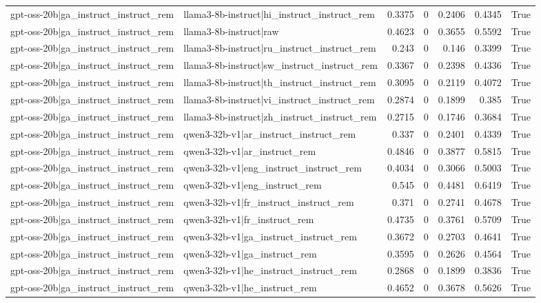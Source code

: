 \begin{table}
\begin{tabular}{l l r r r r l}
gpt-oss-20b|ga_instruct_instruct_rem & llama3-8b-instruct|hi_instruct_instruct_rem & 0.3375 & 0 & 0.2406 & 0.4345 & True \\
gpt-oss-20b|ga_instruct_instruct_rem & llama3-8b-instruct|raw & 0.4623 & 0 & 0.3655 & 0.5592 & True \\
gpt-oss-20b|ga_instruct_instruct_rem & llama3-8b-instruct|ru_instruct_instruct_rem & 0.243 & 0 & 0.146 & 0.3399 & True \\
gpt-oss-20b|ga_instruct_instruct_rem & llama3-8b-instruct|sw_instruct_instruct_rem & 0.3367 & 0 & 0.2398 & 0.4336 & True \\
gpt-oss-20b|ga_instruct_instruct_rem & llama3-8b-instruct|th_instruct_instruct_rem & 0.3095 & 0 & 0.2119 & 0.4072 & True \\
gpt-oss-20b|ga_instruct_instruct_rem & llama3-8b-instruct|vi_instruct_instruct_rem & 0.2874 & 0 & 0.1899 & 0.385 & True \\
gpt-oss-20b|ga_instruct_instruct_rem & llama3-8b-instruct|zh_instruct_instruct_rem & 0.2715 & 0 & 0.1746 & 0.3684 & True \\
gpt-oss-20b|ga_instruct_instruct_rem & qwen3-32b-v1|ar_instruct_instruct_rem & 0.337 & 0 & 0.2401 & 0.4339 & True \\
gpt-oss-20b|ga_instruct_instruct_rem & qwen3-32b-v1|ar_instruct_rem & 0.4846 & 0 & 0.3877 & 0.5815 & True \\
gpt-oss-20b|ga_instruct_instruct_rem & qwen3-32b-v1|eng_instruct_instruct_rem & 0.4034 & 0 & 0.3066 & 0.5003 & True \\
gpt-oss-20b|ga_instruct_instruct_rem & qwen3-32b-v1|eng_instruct_rem & 0.545 & 0 & 0.4481 & 0.6419 & True \\
gpt-oss-20b|ga_instruct_instruct_rem & qwen3-32b-v1|fr_instruct_instruct_rem & 0.371 & 0 & 0.2741 & 0.4678 & True \\
gpt-oss-20b|ga_instruct_instruct_rem & qwen3-32b-v1|fr_instruct_rem & 0.4735 & 0 & 0.3761 & 0.5709 & True \\
gpt-oss-20b|ga_instruct_instruct_rem & qwen3-32b-v1|ga_instruct_instruct_rem & 0.3672 & 0 & 0.2703 & 0.4641 & True \\
gpt-oss-20b|ga_instruct_instruct_rem & qwen3-32b-v1|ga_instruct_rem & 0.3595 & 0 & 0.2626 & 0.4564 & True \\
gpt-oss-20b|ga_instruct_instruct_rem & qwen3-32b-v1|he_instruct_instruct_rem & 0.2868 & 0 & 0.1899 & 0.3836 & True \\
gpt-oss-20b|ga_instruct_instruct_rem & qwen3-32b-v1|he_instruct_rem & 0.4652 & 0 & 0.3678 & 0.5626 & True \\

\end{tabular}
\end{table}
